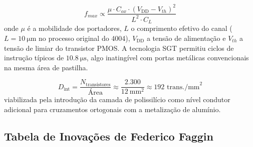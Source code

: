\begin{equation}
\label{eq:fmax}
f_{max} \propto \frac{\mu \cdot C_{ox} \cdot (V_{\text{DD}} - V_{th})^2}{L^2 \cdot C_L}
\end{equation}
onde $\mu$ é a mobilidade dos portadores, $L$ o comprimento efetivo do canal ($L = \SI{10}{\micro\meter}$ no processo original do 4004), $V_{\text{DD}}$ a tensão de alimentação e $V_{th}$ a tensão de limiar do transistor PMOS. A tecnologia SGT permitiu ciclos de instrução típicos de $\SI{10.8}{\micro\second}$, algo inatingível com portas metálicas convencionais na mesma área de pastilha.

\begin{equation}
\label{eq:densidade}
D_{\text{int}} = \frac{N_{\text{transistores}}}{\text{Área}} \approx \frac{2.300}{\SI{12}{\milli\meter\squared}} \approx 192\text{ trans./mm}^2
\end{equation}
viabilizada pela introdução da camada de polissilício como nível condutor adicional para cruzamentos ortogonais com a metalização de alumínio.

\subsection{Tabela de Inovações de Federico Faggin}
\label{subsec:tabela_faggin}

